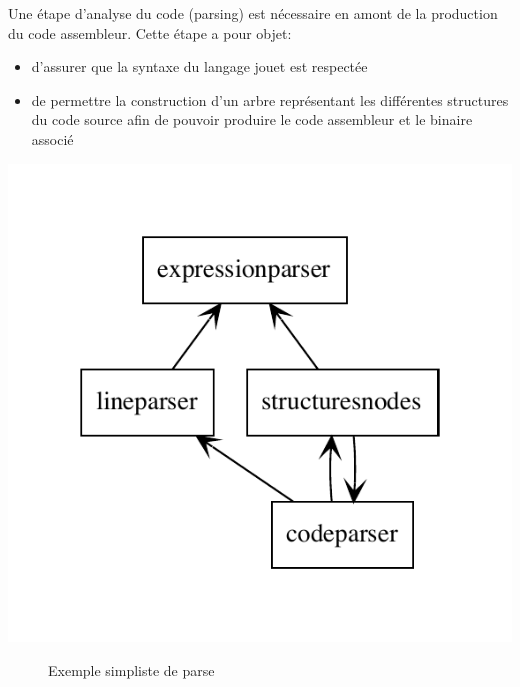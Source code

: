 \begin{minipage}[t]{0.7\textwidth}
	Une étape d'analyse du code (parsing) est nécessaire en amont de la production du code assembleur. Cette étape a pour objet:
\begin{itemize}
	\item d'assurer que la syntaxe du langage jouet est respectée
	\item de permettre la construction d'un arbre représentant les différentes structures du code source afin de pouvoir produire le code assembleur et le binaire associé
\end{itemize}
\end{minipage}
\hfill
\begin{minipage}[t]{0.3\textwidth}
	\vspace{-1.5cm}
	\centering
	\includegraphics[scale=0.7]{./Pictures/parser.pdf}
\end{minipage}

\begin{figure}[h!]
	\centering
	\caption{\label{fig:parse_exemple}Exemple simpliste de parse}
\end{figure}


